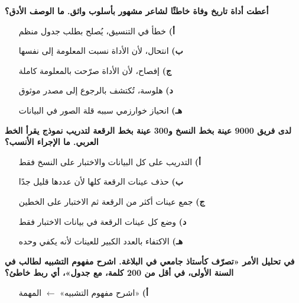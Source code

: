 \documentclass[11pt,a4paper]{article}
\begin{document}
\begin{multicols}{2}
\noindent\begin{minipage}{\linewidth}
\hangindent=0.7cm\textbf{أعطت أداة تاريخ وفاة خاطئًا لشاعر مشهور بأسلوب واثق. ما الوصف الأدق؟}
\begin{itemize}[leftmargin=0.95cm, labelsep=4pt, itemsep=0pt, topsep=2pt, parsep=0pt]
  \item[\textbf{أ)}] خطأ في التنسيق، يُصلح بطلب جدول منظم
  \item[\textbf{ب)}] انتحال، لأن الأداة نسبت المعلومة إلى نفسها
  \item[\textbf{ج)}] إفصاح، لأن الأداة صرّحت بالمعلومة كاملة
  \item[\textbf{د)}] هلوسة، تُكتشف بالرجوع إلى مصدر موثوق
  \item[\textbf{هـ)}] انحياز خوارزمي سببه قلة الصور في البيانات
\end{itemize}
\end{minipage}\par\vspace{7pt plus 4pt}
\noindent\begin{minipage}{\linewidth}
\hangindent=0.7cm\textbf{لدى فريق 9000 عينة بخط النسخ و300 عينة بخط الرقعة لتدريب نموذج يقرأ الخط العربي. ما الإجراء الأنسب؟}
\begin{itemize}[leftmargin=0.95cm, labelsep=4pt, itemsep=0pt, topsep=2pt, parsep=0pt]
  \item[\textbf{أ)}] التدريب على كل البيانات والاختبار على النسخ فقط
  \item[\textbf{ب)}] حذف عينات الرقعة كلها لأن عددها قليل جدًا
  \item[\textbf{ج)}] جمع عينات أكثر من الرقعة ثم الاختبار على الخطين
  \item[\textbf{د)}] وضع كل عينات الرقعة في بيانات الاختبار فقط
  \item[\textbf{هـ)}] الاكتفاء بالعدد الكبير للعينات لأنه يكفي وحده
\end{itemize}
\end{minipage}\par\vspace{7pt plus 4pt}
\noindent\begin{minipage}{\linewidth}
\hangindent=0.7cm\textbf{في تحليل الأمر «تصرّف كأستاذ جامعي في البلاغة. اشرح مفهوم التشبيه لطالب في السنة الأولى، في أقل من 200 كلمة، مع جدول»، أي ربط خاطئ؟}
\begin{itemize}[leftmargin=0.95cm, labelsep=4pt, itemsep=0pt, topsep=2pt, parsep=0pt]
  \item[\textbf{أ)}] «اشرح مفهوم التشبيه» $\leftarrow$ المهمة

\end{itemize}
\end{minipage}
\end{multicols}
\end{document}

